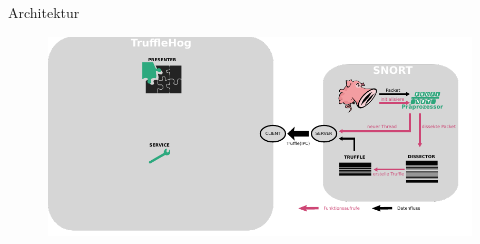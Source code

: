 \begin{frame}{Architektur}
    \begin{figure}
    	\centering
    	\includegraphics[width=\textwidth]{./images/9.pdf}
    \end{figure}
\end{frame}
